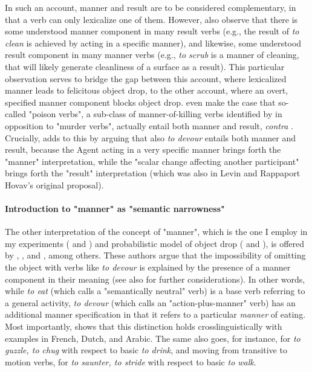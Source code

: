 In such an account, manner and result are to be considered complementary, in that a verb can only lexicalize one of them. However, \textcite{LevinRappaportHovav2008} also observe that there is some understood manner component in many result verbs (e.g., the result of \textit{to clean} is achieved by acting in a specific manner), and likewise, some understood result component in many manner verbs (e.g., \textit{to scrub} is a manner of cleaning, that will likely generate cleanliness of a surface as a result). This particular observation serves to bridge the gap between this account, where lexicalized manner leads to felicitous object drop, to the other account, where an overt, specified manner component blocks object drop. \textcite[5]{BeaversKoontzGarboden2012} even make the case that so-called "poison verbs", a sub-class of manner-of-killing verbs identified by \textcite[230-233]{Levin1993} in opposition to "murder verbs", actually entail both manner and result, \textit{contra} \textcite{LevinRappaportHovav2008, RappaportLevin1998building}. Crucially, \textcite[71, 89]{Melchin2019} adds to this by arguing that also \textit{to devour} entails both manner and result, because the Agent acting in a very specific manner brings forth the "manner" interpretation, while the "scalar change affecting another participant" brings forth the "result" interpretation (which was also in Levin and Rappaport Hovav's original proposal).

\paragraph{Introduction to "manner" as "semantic narrowness"}
The other interpretation of the concept of "manner", which is the one I employ in my experiments ( and ) and probabilistic model of object drop ( and ), is offered by \textcite{Rice1988}, \textcite{FellbaumKegl1989taxonomic}, and \textcite{Naess2007}, among others. These authors argue that the impossibility of omitting the object with verbs like \textit{to devour} is explained by the presence of a manner component in their meaning (see also \textcite{Garcia-VelascoMunoz2002} for further considerations). In other words, while \textit{to eat} (which \textcite{Rice1988} calls a "semantically neutral" verb) is a base verb referring to a general activity, \textit{to devour} (which \textcite{Rice1988} calls an "action-plus-manner" verb) has an additional manner specification in that it refers to a particular \textit{manner} of eating. Most importantly, \textcite[49-50]{Melchin2019} shows that this distinction holds crosslinguistically with examples in French, Dutch, and Arabic. The same also goes, for instance, for \textit{to guzzle, to chug} with respect to basic \textit{to drink}, and moving from transitive to motion verbs, for \textit{to saunter, to stride} with respect to basic \textit{to walk}.

